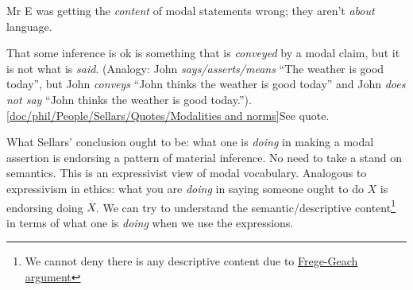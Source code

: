 Mr E was getting the \emph{content} of modal statements wrong; they aren't \emph{about} language.

That some inference is ok is something that is \emph{conveyed} by a modal claim, but it is not what is \emph{said}. (Analogy: John \emph{says/asserts/means} ``The weather is good today'', but John \emph{conveys} ``John thinks the weather is good today'' and John \emph{does not say} ``John thinks the weather is good today.''). \ref{doc/phil/People/Sellars/Quotes/Modalities and norms}{See quote}.


What Sellars' conclusion ought to be: what one is \emph{doing} in making a modal assertion is endorsing a pattern of material inference. No need to take a stand on semantics. This is an expressivist view of modal vocabulary. Analogous to expressivism in ethics: what you are \emph{doing} in saying someone ought to do $X$ is endorsing doing $X$. We can try to understand the semantic/descriptive content\footnote{We cannot deny there is any descriptive content due to \href{doc/phil/Phil Problems/Frege Geach}{Frege-Geach argument}} in terms of what one is \emph{doing} when we use the expressions.